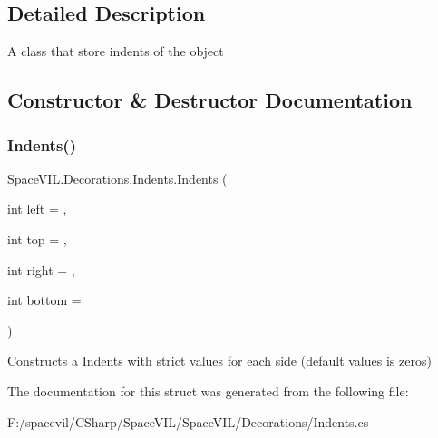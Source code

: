 \subsection{Detailed Description}
A class that store indents of the object 



\subsection{Constructor \& Destructor Documentation}
\mbox{\label{struct_space_v_i_l_1_1_decorations_1_1_indents_ab4ff2d499016f5ac819720f150cb09f1}} 
\subsubsection{\texorpdfstring{Indents()}{Indents()}}
{\footnotesize\ttfamily Space\+V\+I\+L.\+Decorations.\+Indents.\+Indents (\begin{DoxyParamCaption}\item[{int}]{left = {},  }\item[{int}]{top = {},  }\item[{int}]{right = {},  }\item[{int}]{bottom = {} }\end{DoxyParamCaption})}



Constructs a \mbox{\hyperlink{struct_space_v_i_l_1_1_decorations_1_1_indents}{Indents}} with strict values for each side (default values is zeros) 



The documentation for this struct was generated from the following file\+:\begin{DoxyCompactItemize}
\item 
F\+:/spacevil/\+C\+Sharp/\+Space\+V\+I\+L/\+Space\+V\+I\+L/\+Decorations/Indents.\+cs\end{DoxyCompactItemize}
